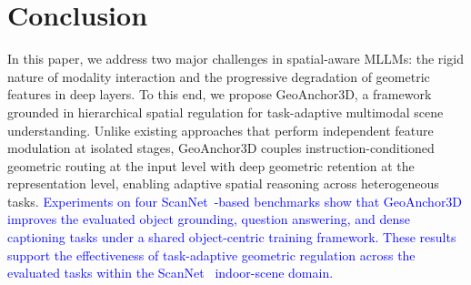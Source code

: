 \documentclass[lettersize,journal]{IEEEtran}
\begin{document}
\section{Conclusion}

In this paper, we address two major challenges in spatial-aware MLLMs: the rigid nature of modality interaction and the progressive degradation of geometric features in deep layers. To this end, we propose GeoAnchor3D, a framework grounded in hierarchical spatial regulation for task-adaptive multimodal scene understanding. Unlike existing approaches that perform independent feature modulation at isolated stages, GeoAnchor3D couples instruction-conditioned geometric routing at the input level with deep geometric retention at the representation level, enabling adaptive spatial reasoning across heterogeneous tasks. \textcolor{blue}{Experiments on four ScanNet~\cite{scannet2017}-based benchmarks show that GeoAnchor3D improves the evaluated object grounding, question answering, and dense captioning tasks under a shared object-centric training framework. These results support the effectiveness of task-adaptive geometric regulation across the evaluated tasks within the ScanNet~\cite{scannet2017} indoor-scene domain.}



\end{document}
